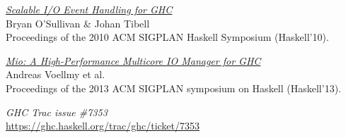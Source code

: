 \documentclass[10pt, oneside]{article}
\begin{document}
\renewcommand\refname{References}

\begin{thebibliography}{9}

  \href{http://research.google.com/pubs/pub36841.html}{\emph{Scalable I/O Event Handling for GHC}}\\
  \newblock Bryan O'Sullivan \& Johan Tibell\\
  \newblock Proceedings of the 2010 ACM SIGPLAN Haskell Symposium (Haskell'10).

  \href{http://haskell.cs.yale.edu/wp-content/uploads/2013/08/hask035-voellmy.pdf}{\emph{Mio:
      A High-Performance Multicore IO
      Manager for GHC}}\\
  \newblock Andreas Voellmy et al.\\
  \newblock Proceedings of the 2013 ACM SIGPLAN symposium on Haskell (Haskell'13).

 \emph{GHC Trac issue \#7353}\\
  \newblock \url{https://ghc.haskell.org/trac/ghc/ticket/7353}

\end{thebibliography}
\end{document}
